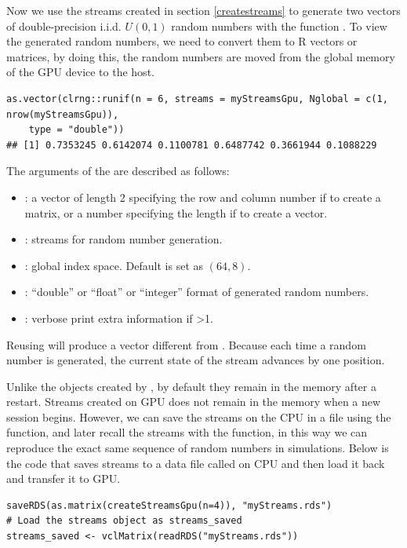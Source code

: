 \documentclass[article,nojss]{jss}\usepackage[]{graphicx}\usepackage[]{color}
\makeatletter
\newenvironment{kframe}{%
 \def\at@end@of@kframe{}%
 \ifinner\ifhmode%
  \def\at@end@of@kframe{\end{minipage}}%
  \begin{minipage}{\columnwidth}%
 \fi\fi%
 \def\FrameCommand##1{\hskip\@totalleftmargin \hskip-\fboxsep
 \colorbox{shadecolor}{##1}\hskip-\fboxsep
     \hskip-\linewidth \hskip-\@totalleftmargin \hskip\columnwidth}%
 \MakeFramed {\advance\hsize-\width
   \@totalleftmargin\z@ \linewidth\hsize
   \@setminipage}}%
 {\par\unskip\endMakeFramed%
 \at@end@of@kframe}
\newenvironment{knitrout}{}{} %
\newcommand{\fct}[1]{\code{#1()}}
\makeatother
\begin{document}
Now we use the streams created in section \ref{createstreams} to generate two vectors of double-precision i.i.d. $U(0,1)$ random numbers with the function \fct{runif}. To view the generated random numbers, we need to convert them to R vectors or matrices, by doing this, the random numbers are moved from the global memory of the GPU device to the host.
\begin{knitrout}
\color{fgcolor}\begin{kframe}
\begin{verbatim}
as.vector(clrng::runif(n = 6, streams = myStreamsGpu, Nglobal = c(1, nrow(myStreamsGpu)),
    type = "double"))
## [1] 0.7353245 0.6142074 0.1100781 0.6487742 0.3661944 0.1088229
\end{verbatim}
\end{kframe}
\end{knitrout}
The arguments of the \fct{clrng::runif} are described as follows:
\begin{itemize}
\itemsep0em 
  \item {}: a vector of length 2 specifying the row and column number if to create a matrix, or a number specifying the length if to create a vector.
  \item {}: streams for random number generation.
  \item {}: global index space. Default is set as $(64,8)$.
  \item {}: ``double'' or ``float'' or ``integer'' format of generated random numbers.
  \item {}: verbose print extra information if >1.
\end{itemize}
Reusing  will produce a vector different from . Because each time a random number is generated, the current state of the stream advances by one position. %

Unlike the objects created by , by default they remain in the memory after a restart. Streams created on GPU does not remain in the memory when a new  session begins. However, we can save the streams on the CPU in a file using the \fct{saveRDS} function, and later recall the streams with the \fct{readRDS} function, in this way we can reproduce the exact same sequence of random numbers in simulations. Below is the code that saves streams to a data file called  on CPU and then load it back and transfer it to GPU.
\begin{knitrout}
\color{fgcolor}\begin{kframe}
\begin{verbatim}
saveRDS(as.matrix(createStreamsGpu(n=4)), "myStreams.rds")
# Load the streams object as streams_saved
streams_saved <- vclMatrix(readRDS("myStreams.rds"))
\end{verbatim}
\end{kframe}
\end{knitrout}
\end{document}
